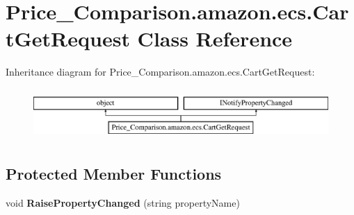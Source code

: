 \hypertarget{class_price___comparison_1_1amazon_1_1ecs_1_1_cart_get_request}{\section{Price\-\_\-\-Comparison.\-amazon.\-ecs.\-Cart\-Get\-Request Class Reference}
\label{class_price___comparison_1_1amazon_1_1ecs_1_1_cart_get_request}
}


 


Inheritance diagram for Price\-\_\-\-Comparison.\-amazon.\-ecs.\-Cart\-Get\-Request\-:\begin{figure}[H]
\begin{center}
\leavevmode
\includegraphics[height=1.958042cm]{class_price___comparison_1_1amazon_1_1ecs_1_1_cart_get_request}
\end{center}
\end{figure}
\subsection*{Protected Member Functions}
\begin{DoxyCompactItemize}
\item 
\hypertarget{class_price___comparison_1_1amazon_1_1ecs_1_1_cart_get_request_ae3b2bc54466dad02343fc40a26a2bed1}{void {\bfseries Raise\-Property\-Changed} (string property\-Name)}\label{class_price___comparison_1_1amazon_1_1ecs_1_1_cart_get_request_ae3b2bc54466dad02343fc40a26a2bed1}

\end{DoxyCompactItemize}
